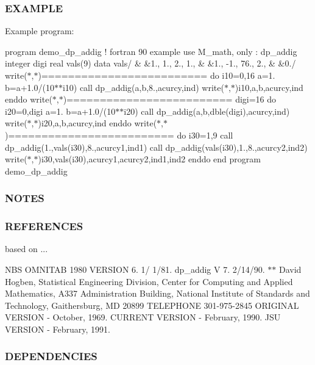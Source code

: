 \subsubsection*{E\+X\+A\+M\+P\+LE}

Example program\+:

program demo\+\_\+dp\+\_\+addig ! fortran 90 example use M\+\_\+math, only \+: dp\+\_\+addig integer digi real vals(9) data vals/ \& \&1., 1., 2., 1., \& \&1., -\/1., 76., 2., \& \&0./ write($\ast$,$\ast$)\textquotesingle{}=========================\textquotesingle{} do i10=0,16 a=1. b=a+1.0/(10$\ast$$\ast$i10) call dp\+\_\+addig(a,b,8.,acurcy,ind) write($\ast$,$\ast$)i10,a,b,acurcy,ind enddo write($\ast$,$\ast$)\textquotesingle{}=========================\textquotesingle{} digi=16 do i20=0,digi a=1. b=a+1.0/(10$\ast$$\ast$i20) call dp\+\_\+addig(a,b,dble(digi),acurcy,ind) write($\ast$,$\ast$)i20,a,b,acurcy,ind enddo write($\ast$,$\ast$)\textquotesingle{}=========================\textquotesingle{} do i30=1,9 call dp\+\_\+addig(1.,vals(i30),8.,acurcy1,ind1) call dp\+\_\+addig(vals(i30),1.,8.,acurcy2,ind2) write($\ast$,$\ast$)i30,vals(i30),acurcy1,acurcy2,ind1,ind2 enddo end program demo\+\_\+dp\+\_\+addig

\subsubsection*{N\+O\+T\+ES}

\subsubsection*{R\+E\+F\+E\+R\+E\+N\+C\+ES}

based on ...

N\+BS O\+M\+N\+I\+T\+AB 1980 V\+E\+R\+S\+I\+ON 6. 1/ 1/81. dp\+\_\+addig V 7. 2/14/90. $\ast$$\ast$ David Hogben, Statistical Engineering Division, Center for Computing and Applied Mathematics, A337 Administration Building, National Institute of Standards and Technology, Gaithersburg, MD 20899 T\+E\+L\+E\+P\+H\+O\+NE 301-\/975-\/2845 O\+R\+I\+G\+I\+N\+AL V\+E\+R\+S\+I\+ON -\/ October, 1969. C\+U\+R\+R\+E\+NT V\+E\+R\+S\+I\+ON -\/ February, 1990. J\+SU V\+E\+R\+S\+I\+ON -\/ February, 1991.

\subsubsection*{D\+E\+P\+E\+N\+D\+E\+N\+C\+I\+ES}

